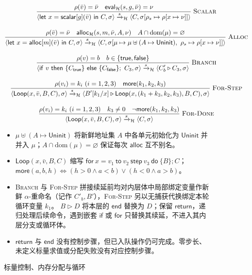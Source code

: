 \documentclass[UTF8,a4paper,11pt,fontset=fandol]{ctexart}
\newcommand{\kw}[1]{\ensuremath{\mathsf{#1}}}
\newcommand{\infer}[2]{\displaystyle\frac{\displaystyle #1}{\displaystyle #2}}
\begin{document}
\begin{figure}[!htbp]
\centering\small
\[
\begin{gathered}
\infer{\rho(\bar v)=\bar\nu\quad\mathsf{eval}_{\mathcal H}(s,g,\bar\nu)=\nu}
 {\langle\kw{let}\ x=\kw{scalar}[g](\bar v)\ \kw{in}\ C,\sigma\rangle
 \xrightarrow{s}_{\mathcal H}\langle C,\sigma[\rho_s\mapsto\rho[x\mapsto\nu]]\rangle}
 \;\textsc{Scalar}\\[1em]
\infer{\rho(\bar v)=\bar\nu\quad\mathsf{alloc}_{\mathcal H}(s,m,\bar\nu,A,\nu)\quad A\cap\mathrm{dom}(\mu)=\varnothing}
 {\langle\kw{let}\ x=\kw{alloc}[m](\bar v)\ \kw{in}\ C,\sigma\rangle
 \xrightarrow{s}_{\mathcal H}\langle C,\sigma[\mu\mapsto\mu\uplus(A\mapsto\mathsf{Uninit}),\ \rho_s\mapsto\rho[x\mapsto\nu]]\rangle}
 \;\textsc{Alloc}\\[1em]
\infer{\rho(v)=b\quad b\in\{\kw{true},\kw{false}\}}
 {\langle\kw{if}\ v\ \kw{then}\ \{C_{\kw{true}}\}\ \kw{else}\ \{C_{\kw{false}}\};\ C_3,\sigma\rangle
 \xrightarrow{s}_{\mathcal H}\langle C'_b\triangleright C_3,\sigma\rangle}
 \;\textsc{Branch}\\[1em]
\infer{\rho(v_i)=k_i\ (i=1,2,3)\quad\mathsf{more}(k_1,k_2,k_3)}
 {\langle\mathsf{Loop}(x,\bar v,B,C),\sigma\rangle
 \xrightarrow{s}_{\mathcal H}\langle B'[k_1/x]\triangleright
 \mathsf{Loop}(x,(k_1+k_3,k_2,k_3),B,C),\sigma\rangle}
 \;\textsc{For-Step}\\[1em]
\infer{\rho(v_i)=k_i\ (i=1,2,3)\quad k_3\ne0\quad\neg\mathsf{more}(k_1,k_2,k_3)}
 {\langle\mathsf{Loop}(x,\bar v,B,C),\sigma\rangle
 \xrightarrow{s}_{\mathcal H}\langle C,\sigma\rangle}
 \;\textsc{For-Done}
\end{gathered}
\]
\caption{标量控制、内存分配与循环}
\begin{itemize}
\item $\mu\uplus(A\mapsto\mathsf{Uninit})$ 将新鲜地址集 $A$ 中各单元初始化为 $\mathsf{Uninit}$ 并并入 $\mu$；$A\cap\mathrm{dom}(\mu)=\varnothing$ 保证每次 \kw{alloc} 互不别名。
\item $\mathsf{Loop}(x,\bar v,B,C)$ 缩写
$\kw{for}\ x=v_1\ \kw{to}\ v_2\ \kw{step}\ v_3\ \kw{do}\ \{B\};C$；
$\mathsf{more}(a,b,h)\iff(h>0\land a<b)\lor(h<0\land a>b)$。
\item \textsc{Branch} 与 \textsc{For-Step} 拼接续延前均对内层体中局部绑定变量作新鲜 $\alpha$-重命名（记作 $C'_b,B'$），\textsc{For-Step} 另以无捕获代换绑定本轮循环变量 $k_1$。
$B\triangleright D$ 将本层的 \kw{end} 替换为 $D$；保留 \kw{return}，递归处理后续命令，遇到嵌套 \kw{if} 或 \kw{for} 只替换其续延，不进入其内层分支或循环体。
\item \kw{return} 与 \kw{end} 没有控制步骤，但已入队操作仍可完成。零步长、未定义标量求值或分配失败没有对应控制步骤。
\end{itemize}
\end{figure}
\end{document}
